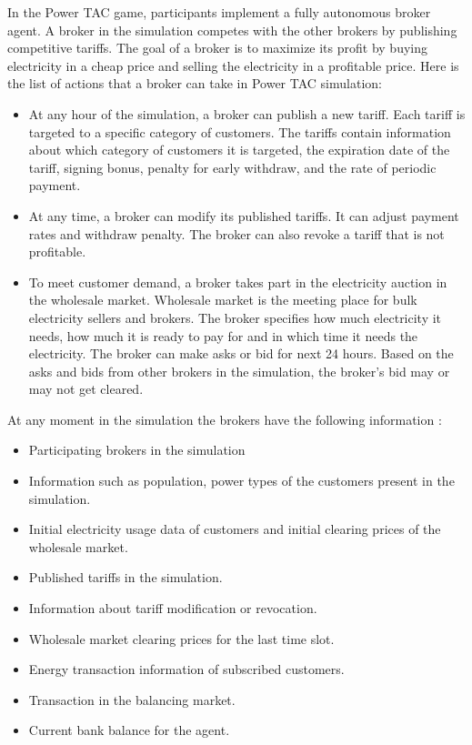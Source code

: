 In the Power TAC game, participants implement a fully autonomous broker agent. A broker in the simulation competes with the other brokers by publishing competitive tariffs. The goal of a broker is to maximize its profit by buying electricity in a cheap price and selling the electricity in a profitable price. Here is the list of actions that a broker can take in Power TAC simulation:
\begin{itemize}  
\item At any hour of the simulation, a broker can publish a new tariff. Each tariff is targeted to a specific category of customers. The tariffs contain information about which category of customers it is targeted, the expiration date of the tariff, signing bonus, penalty for early withdraw, and the rate of periodic payment. 
\item At any time, a broker can modify its published tariffs. It can adjust payment rates and withdraw penalty. The broker can also revoke a tariff that is not profitable.
\item To meet customer demand, a broker takes part in the electricity auction in the wholesale market. Wholesale market is the meeting place for bulk electricity sellers and brokers. The broker specifies how much electricity it needs, how much it is ready to pay for and in which time it needs the electricity. The broker can make asks or bid for next 24 hours. Based on the asks and bids from other brokers in the simulation, the broker's bid may or may not get cleared. 
\end{itemize}

At any moment in the simulation the brokers have the following information : 
\begin{itemize}  
\item Participating brokers in the simulation 
\item Information such as population, power types of the customers present in the simulation.
\item Initial electricity usage data of customers and initial clearing prices of the wholesale market.
\item Published tariffs in the simulation.
\item Information about tariff modification or revocation.
\item Wholesale market clearing prices for the last time slot.
\item Energy transaction information of subscribed customers.
\item Transaction in the balancing market.
\item Current bank balance for the agent.
\end{itemize}


